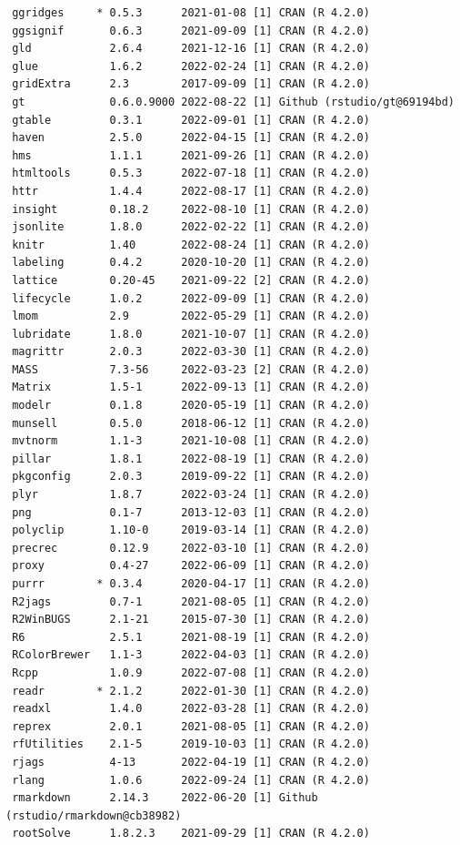 \documentclass[article]{jss}
\begin{document}
\begin{verbatim}
 ggridges     * 0.5.3      2021-01-08 [1] CRAN (R 4.2.0)
 ggsignif       0.6.3      2021-09-09 [1] CRAN (R 4.2.0)
 gld            2.6.4      2021-12-16 [1] CRAN (R 4.2.0)
 glue           1.6.2      2022-02-24 [1] CRAN (R 4.2.0)
 gridExtra      2.3        2017-09-09 [1] CRAN (R 4.2.0)
 gt             0.6.0.9000 2022-08-22 [1] Github (rstudio/gt@69194bd)
 gtable         0.3.1      2022-09-01 [1] CRAN (R 4.2.0)
 haven          2.5.0      2022-04-15 [1] CRAN (R 4.2.0)
 hms            1.1.1      2021-09-26 [1] CRAN (R 4.2.0)
 htmltools      0.5.3      2022-07-18 [1] CRAN (R 4.2.0)
 httr           1.4.4      2022-08-17 [1] CRAN (R 4.2.0)
 insight        0.18.2     2022-08-10 [1] CRAN (R 4.2.0)
 jsonlite       1.8.0      2022-02-22 [1] CRAN (R 4.2.0)
 knitr          1.40       2022-08-24 [1] CRAN (R 4.2.0)
 labeling       0.4.2      2020-10-20 [1] CRAN (R 4.2.0)
 lattice        0.20-45    2021-09-22 [2] CRAN (R 4.2.0)
 lifecycle      1.0.2      2022-09-09 [1] CRAN (R 4.2.0)
 lmom           2.9        2022-05-29 [1] CRAN (R 4.2.0)
 lubridate      1.8.0      2021-10-07 [1] CRAN (R 4.2.0)
 magrittr       2.0.3      2022-03-30 [1] CRAN (R 4.2.0)
 MASS           7.3-56     2022-03-23 [2] CRAN (R 4.2.0)
 Matrix         1.5-1      2022-09-13 [1] CRAN (R 4.2.0)
 modelr         0.1.8      2020-05-19 [1] CRAN (R 4.2.0)
 munsell        0.5.0      2018-06-12 [1] CRAN (R 4.2.0)
 mvtnorm        1.1-3      2021-10-08 [1] CRAN (R 4.2.0)
 pillar         1.8.1      2022-08-19 [1] CRAN (R 4.2.0)
 pkgconfig      2.0.3      2019-09-22 [1] CRAN (R 4.2.0)
 plyr           1.8.7      2022-03-24 [1] CRAN (R 4.2.0)
 png            0.1-7      2013-12-03 [1] CRAN (R 4.2.0)
 polyclip       1.10-0     2019-03-14 [1] CRAN (R 4.2.0)
 precrec        0.12.9     2022-03-10 [1] CRAN (R 4.2.0)
 proxy          0.4-27     2022-06-09 [1] CRAN (R 4.2.0)
 purrr        * 0.3.4      2020-04-17 [1] CRAN (R 4.2.0)
 R2jags         0.7-1      2021-08-05 [1] CRAN (R 4.2.0)
 R2WinBUGS      2.1-21     2015-07-30 [1] CRAN (R 4.2.0)
 R6             2.5.1      2021-08-19 [1] CRAN (R 4.2.0)
 RColorBrewer   1.1-3      2022-04-03 [1] CRAN (R 4.2.0)
 Rcpp           1.0.9      2022-07-08 [1] CRAN (R 4.2.0)
 readr        * 2.1.2      2022-01-30 [1] CRAN (R 4.2.0)
 readxl         1.4.0      2022-03-28 [1] CRAN (R 4.2.0)
 reprex         2.0.1      2021-08-05 [1] CRAN (R 4.2.0)
 rfUtilities    2.1-5      2019-10-03 [1] CRAN (R 4.2.0)
 rjags          4-13       2022-04-19 [1] CRAN (R 4.2.0)
 rlang          1.0.6      2022-09-24 [1] CRAN (R 4.2.0)
 rmarkdown      2.14.3     2022-06-20 [1] Github (rstudio/rmarkdown@cb38982)
 rootSolve      1.8.2.3    2021-09-29 [1] CRAN (R 4.2.0)

\end{verbatim}
\end{document}

